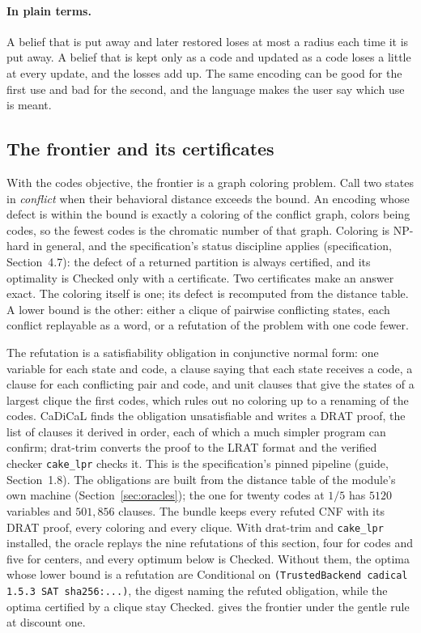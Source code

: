 \documentclass[11pt]{article}
\newcommand{\code}[1]{\texttt{#1}}
\newcommand{\plain}{\paragraph{In plain terms.}}
\newcommand{\spec}[1]{specification, Section~#1}
\theoremstyle{definition}
\theoremstyle{plain}
\begin{document}
\plain A belief that is put away and later restored loses at most a radius each time it is put away.
A belief that is kept only as a code and updated as a code loses a little at every update, and
the losses add up. The same encoding can be good for the first use and bad for the second, and the
language makes the user say which use is meant.

\subsection{The frontier and its certificates}\label{sec:ex1frontier}

With the codes objective, the frontier is a graph coloring problem. Call two states in
\emph{conflict} when their behavioral distance exceeds the bound. An encoding whose defect is within
the bound is exactly a coloring of the conflict graph, colors being codes, so the fewest codes is
the chromatic number of that graph. Coloring is NP-hard in general, and the specification's status
discipline applies (\spec{4.7}): the defect of a returned partition is always certified, and its
optimality is Checked only with a certificate. Two certificates make an answer exact. The coloring
itself is one; its defect is recomputed from the distance table. A lower bound is the other: either
a clique of pairwise conflicting states, each conflict replayable as a word, or a refutation of the
problem with one code fewer.

The refutation is a satisfiability obligation in conjunctive normal form: one variable for each
state and code, a clause saying that each state receives a code, a clause for each conflicting pair
and code, and unit clauses that give the states of a largest clique the first codes, which rules out
no coloring up to a renaming of the codes. CaDiCaL finds the obligation unsatisfiable and writes a
DRAT proof, the list of clauses it derived in order, each of which a much simpler program can
confirm; drat-trim converts the proof to the LRAT format and the verified checker \code{cake\_lpr}
checks it. This is the specification's pinned pipeline (guide, Section~1.8). The obligations are
built from the distance table of the module's own machine (Section~\ref{sec:oracles}); the one for
twenty codes at $1/5$ has $5120$ variables and $501{,}856$ clauses. The bundle keeps every refuted
CNF with its DRAT proof, every coloring and every clique. With drat-trim and \code{cake\_lpr}
installed, the oracle replays the nine refutations of this section, four for codes and five for
centers, and every optimum below is Checked. Without them, the optima whose lower bound is a
refutation are Conditional on \code{(TrustedBackend cadical 1.5.3 SAT sha256:...)}, the digest
naming the refuted obligation, while the optima certified by a clique stay Checked.
 gives the frontier under the gentle rule at discount one.
\end{document}

